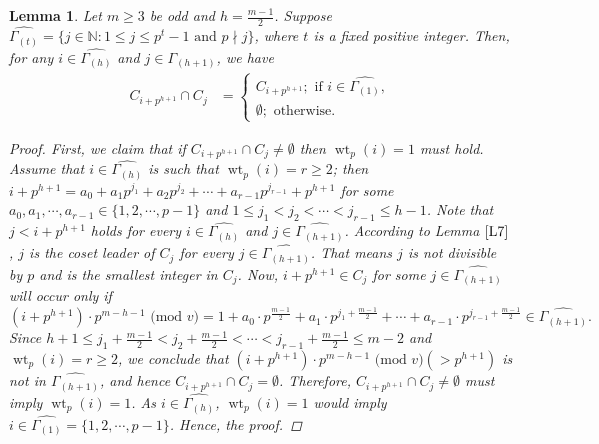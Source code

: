 \documentclass[pdflatex,sn-mathphys-num]{sn-jnl}%
\newtheorem{lemma}{Lemma}
\theoremstyle{thmstyleone}%
\theoremstyle{thmstyletwo}%
\theoremstyle{thmstylethree}%
\begin{document}
\begin{lemma}\label{L19}
    Let $m\geq 3$ be odd and $h=\frac{m-1}{2}$. Suppose $\widehat{\Gamma_{(t)}}=\{j\in\mathbb{N}:1\leq j\leq p^{t}-1\text{ and }p\nmid j\}$, where $t$ is a fixed positive integer. Then, for any $i\in\widehat{\Gamma_{(h)}}$ and $j\in\widehat{\Gamma_{(h+1)}}$, we have 
    \begin{align*}
        C_{i+p^{h+1}}\cap C_{j} &= \begin{cases}
            C_{i+p^{h+1}};\text{ if }i\in\widehat{\Gamma_{(1)}}, \\
            \emptyset;\text{ otherwise.}
        \end{cases}
    \end{align*}
    \begin{proof}
        First, we claim that if $C_{i+p^{h+1}}\cap C_{j}\neq\emptyset$ then $\operatorname{wt}_{p}(i)=1$ must hold. Assume that $i\in\widehat{\Gamma_{(h)}}$ is such that $\operatorname{wt}_{p}(i)=r\geq 2$; then $i+p^{h+1}=a_{0}+a_{1}p^{j_{1}}+a_{2}p^{j_{2}}+\cdots+a_{r-1}p^{j_{r-1}}+p^{h+1}$ for some $a_{0},a_{1},\cdots,a_{r-1}\in\{1,2,\cdots,p-1\}$ and $1\leq j_{1}<j_{2}<\cdots<j_{r-1}\leq h-1$. Note that $j<i+p^{h+1}$ holds for every $i\in\widehat{\Gamma_{(h)}}$ and $j\in\widehat{\Gamma_{(h+1)}}$. According to Lemma $\ref{L7}$, $j$ is the coset leader of $C_{j}$ for every $j\in\widehat{\Gamma_{(h+1)}}$. That means $j$ is not divisible by $p$ and is the smallest integer in $C_{j}$. Now, $i+p^{h+1}\in C_{j}$ for some $j\in\widehat{\Gamma_{(h+1)}}$ will occur only if
        \begin{equation*}
            (i+p^{h+1})\cdot p^{m-h-1}\text{ (mod $v$)}=1+a_{0}\cdot p^{\frac{m-1}{2}}+a_{1}\cdot p^{j_{1}+\frac{m-1}{2}}+\cdots+a_{r-1}\cdot p^{j_{r-1}+\frac{m-1}{2}}\in\widehat{\Gamma_{(h+1)}}.
        \end{equation*}
         Since $h+1\leq j_{1}+\frac{m-1}{2}<j_{2}+\frac{m-1}{2}<\cdots<j_{r-1}+\frac{m-1}{2}\leq m-2$ and $\operatorname{wt}_{p}(i)=r\geq 2$, we conclude that $(i+p^{h+1})\cdot p^{m-h-1}\text{ (mod $v$)}(>p^{h+1})$ is not in $\widehat{\Gamma_{(h+1)}}$, and hence $C_{i+p^{h+1}}\cap C_{j}=\emptyset$. Therefore, $C_{i+p^{h+1}}\cap C_{j}\neq\emptyset$ must imply $\operatorname{wt}_{p}(i)=1$. As $i\in\widehat{\Gamma_{(h)}}$, $\operatorname{wt}_{p}(i)=1$ would imply $i\in\widehat{\Gamma_{(1)}}=\{1,2,\cdots,p-1\}$. Hence, the proof.
    \end{proof}
\end{lemma}
\end{document}
